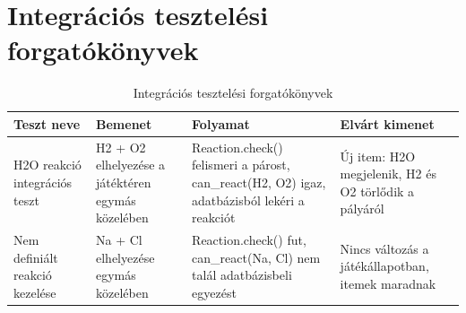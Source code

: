 \documentclass[]{thesis-ekf}
\begin{document}
	\section{Integrációs tesztelési forgatókönyvek}
	
	\begin{table}[ht!]
		\centering
		\footnotesize
		\begin{tabular}{|p{4cm}|p{4cm}|p{4cm}|p{3.5cm}|}
			\hline
			\textbf{Teszt neve} & \textbf{Bemenet} & \textbf{Folyamat} & \textbf{Elvárt kimenet} \\
			\hline
			H2O reakció integrációs teszt
			& H2 + O2 elhelyezése a játéktéren egymás közelében
			& Reaction.check() felismeri a párost, can\_react(H2, O2) igaz, adatbázisból lekéri a reakciót
			& Új item: H2O megjelenik, H2 és O2 törlődik a pályáról \\
			
			\hline
			
			Nem definiált reakció kezelése
			& Na + Cl elhelyezése egymás közelében
			& Reaction.check() fut, can\_react(Na, Cl) nem talál adatbázisbeli egyezést
			& Nincs változás a játékállapotban, itemek maradnak \\
			
			\hline
			
		\end{tabular}
		\caption{Integrációs tesztelési forgatókönyvek}
		\label{tab:ITest}
	\end{table}
	
	
\end{document}

